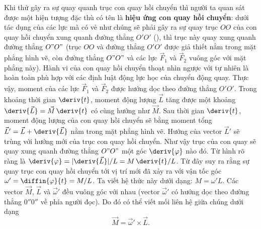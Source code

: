 Khi thử gây ra sự quay quanh trục con quay hồi chuyển thì người ta quan sát được một hiện tượng đặc thù có tên là \textbf{hiệu ứng con quay hồi chuyển}: dưới tác dụng của các lực mà có vẻ như chúng sẽ phải gây ra sự quay trục $OO$ của con quay hồi chuyển xung quanh đường thẳng $O'O'$ (), thì trục này quay xung quanh đường thẳng $O"O"$ (trục $OO$ và đường thẳng $O'O'$ được giả thiết nằm trong mặt phẳng hình vẽ, còn đường thẳng $O"O"$ và các lực $\vec{F}_1$ và $\vec{F}_2$ vuông góc với mặt phẳng này). Hành vi của con quay hồi chuyển thoạt nhìn ngược với tự nhiên là hoàn toàn phù hợp với các định luật động lực học của chuyển động quay. Thực vậy, moment của các lực $\vec{F}_1$ và $\vec{F}_2$ được hướng dọc theo đường thẳng $O'O'$. Trong khoảng thời gian $\deriv{t}$, moment động lượng $\vec{L}$ tăng được một khoảng $\deriv{\vec{L}}=\vec{M}\,\deriv{t}$ có cùng hướng như $\vec{M}$. Sau thời gian $\deriv{t}$, moment động lượng của con quay hồi chuyển sẽ bằng moment tổng $\vec{L}'=\vec{L}+\deriv{\vec{L}}$ nằm trong mặt phẳng hình vẽ. Hướng của vector $\vec{L}'$ sẽ trùng với hướng mới của trục con quay hồi chuyển. Như vậy trục của con quay sẽ quay xung quanh đường thẳng $O"O"$ một góc $\deriv{\varphi}$ nào đó. Từ hình  rõ ràng là $\deriv{\varphi}=|\deriv{\vec{L}}|/L=M\,\deriv{t}/L$. Từ đây suy ra rằng sự quay trục con quay hồi chuyển tới vị trí mới đã xảy ra với vận tốc góc $\omega'=\diffin{\varphi}{t}=M/L$. Ta viết hệ thức này dưới dạng: $M=\omega'L$. Các vector $\vec{M}$, $\vec{L}$ và $\vec{\omega}'$ đều vuông góc với nhau (vector $\vec{\omega}'$ có hướng dọc theo đường thẳng $0''0''$ về phía người đọc). Do đó có thể viết mối liên hệ giữa chúng dưới dạng
\begin{equation}\label{eq:5_69}
	\vec{M} = \vec{\omega}' \times \vec{L}.
\end{equation}

